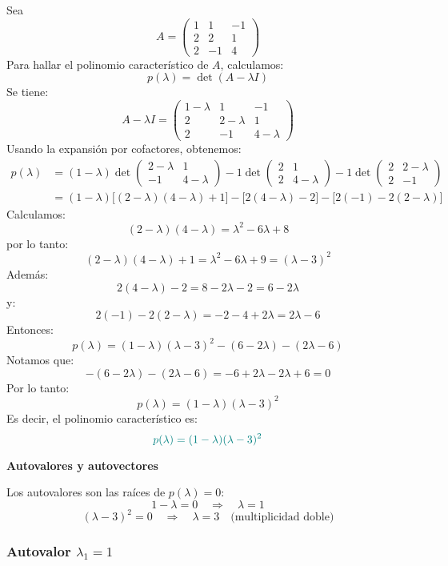 \documentclass{article}
\begin{document}
\begin{enumerate}[label=\textbf{\alph*)}]
Sea
\[
A =
\begin{pmatrix}
1 & 1 & -1\\
2 & 2 & 1\\
2 & -1 & 4
\end{pmatrix}
\]
Para hallar el polinomio característico de \(A\), calculamos:
\[
p(\lambda) = \det(A - \lambda I)
\]
Se tiene:
\[
A - \lambda I =
\begin{pmatrix}
1-\lambda & 1 & -1\\
2 & 2-\lambda & 1\\
2 & -1 & 4-\lambda
\end{pmatrix}
\]
Usando la expansión por cofactores, obtenemos:
\[
\begin{aligned}
p(\lambda)
&= (1-\lambda)\det\begin{pmatrix}2-\lambda & 1\\-1 & 4-\lambda\end{pmatrix}
- 1\det\begin{pmatrix}2 & 1\\2 & 4-\lambda\end{pmatrix}
- 1\det\begin{pmatrix}2 & 2-\lambda\\2 & -1\end{pmatrix}\\[4pt]
&= (1-\lambda)\Big[(2-\lambda)(4-\lambda)+1\Big]
- \Big[2(4-\lambda)-2\Big]
- \Big[2(-1)-2(2-\lambda)\Big]
\end{aligned}
\]
Calculamos:
\[
(2-\lambda)(4-\lambda) = \lambda^2 - 6\lambda + 8
\]
por lo tanto:
\[
(2-\lambda)(4-\lambda) + 1 = \lambda^2 - 6\lambda + 9 = (\lambda - 3)^2
\]
Además:
\[
2(4-\lambda)-2 = 8-2\lambda-2 = 6-2\lambda
\]
y:
\[
2(-1)-2(2-\lambda) = -2-4+2\lambda = 2\lambda-6
\]
Entonces:
\[
p(\lambda) = (1-\lambda)(\lambda-3)^2 - (6-2\lambda) - (2\lambda-6)
\]
Notamos que:
\[
-(6-2\lambda) - (2\lambda-6) = -6+2\lambda-2\lambda+6 = 0
\]
Por lo tanto:
\[
p(\lambda) = (1-\lambda)(\lambda-3)^2
\]
Es decir, el polinomio característico es:
\[
\color{teal}
p(\lambda) = (1-\lambda)(\lambda-3)^2
\]

\textbf{Autovalores y autovectores}

Los autovalores son las raíces de \(p(\lambda) = 0\):
\[
1-\lambda = 0
\quad\Longrightarrow\quad
\lambda = 1
\]
\[
(\lambda-3)^2 = 0
\quad\Longrightarrow\quad
\lambda = 3
\quad\text{(multiplicidad doble)}
\]

\subsubsection*{Autovalor \(\lambda_1 = 1\)}


\end{enumerate}
\end{document}
